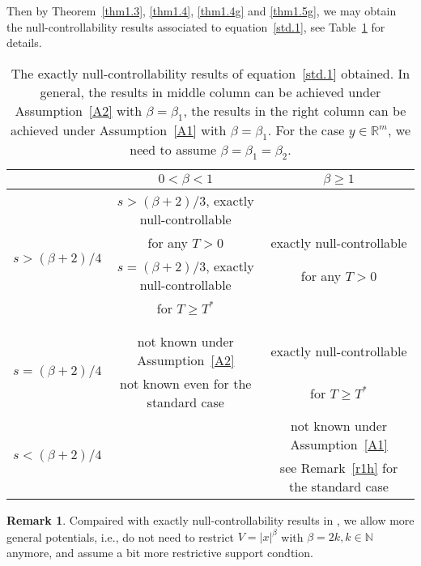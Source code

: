 \documentclass{article}
\numberwithin{equation}{section}
\newcommand\N{\ensuremath{\mathbb{N}}}
\newcommand\R{\ensuremath{\mathbb{R}}}
\numberwithin{equation}{section}
\theoremstyle{definition}
\newtheorem{remark}{Remark}[section]
\begin{document}
Then by Theorem~\ref{thm1.3}, \ref{thm1.4}, \ref{thm1.4g} and \ref{thm1.5g}, we may obtain the null-controllability results associated to equation~\eqref{std.1}, see Table~\ref{table.1} for details. 
\begin{table}[h!]
	\centering
\begin{tabular}{|c|c|c|}
	\hline
	& $0<\beta <1$ & $\beta \ge 1$\\
	\hline
	\multirow{6}{7em}{$s> (\beta+2)/4 $} & $s>(\beta +2) /3$, exactly null-controllable &  \\
						    & for any $T>0$ & exactly null-controllable \\
	\cline{2-2}
						 & $s= (\beta+2) /3$, exactly null-controllable & for any $T>0$\\
						 & for $T\ge T^{*}$ & \\
						 \cline{2-2}
						 &  & \\
						 &  & \\
						 \cline{1-1} \cline{3-3}
	\multirow{2}{7em}{$ s= (\beta +2) /4 $} & not known under Assumption~\ref{A2} & exactly null-controllable \\
						& not known even for the standard case & for $T\ge T^{*}$\\
						\cline{1-1}\cline{3-3}
	\multirow{2}{7em}{$ s< (\beta +2) /4 $} & & not known under Assumption~\ref{A1} \\
						& & see Remark~\ref{r1h} for the standard case\\
	\hline
\end{tabular}
\caption{The exactly null-controllability results of equation~\eqref{std.1} obtained. In general, the results in middle column can be achieved under Assumption~\ref{A2} with $\beta =\beta_1$, the results in the right column can be achieved under Assumption~\ref{A1} with $\beta =\beta_1$. For the case $y\in \R^{m}$, we need to assume $\beta =\beta_1=\beta_2$.}
\label{table.1}
\end{table}

\begin{remark}
	Compaired with exactly null-controllability results in \cite{alphonse2023quantitative}, we allow more general potentials, i.e., do not need to restrict $V=|x|^{\beta}$ with $\beta =2k,k \in \N$ anymore, and assume a bit more restrictive support condtion.
\end{remark}
\end{document}
